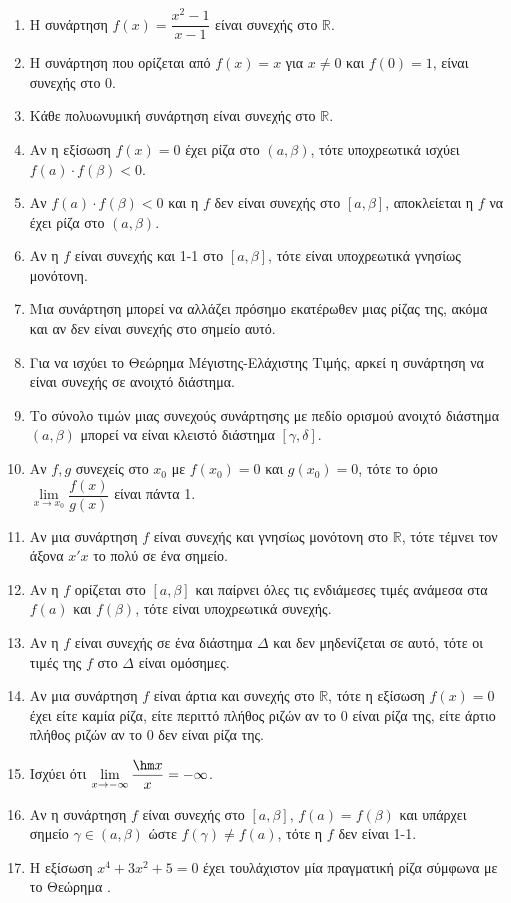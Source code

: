 \begin{enumerate}[label=\textbf{1.\arabic*.}]
    \item Η συνάρτηση $f(x) = \dfrac{x^2-1}{x-1}$ είναι συνεχής στο $\mathbb{R}$.
    \item Η συνάρτηση που ορίζεται από $f(x) = x$ για $x \neq 0$ και $f(0) = 1$, είναι συνεχής στο 0.
    \item Κάθε πολυωνυμική συνάρτηση είναι συνεχής στο $\mathbb{R}$.
    \item Αν η εξίσωση $f(x)=0$ έχει ρίζα στο $(a, \beta)$, τότε υποχρεωτικά ισχύει $f(a) \cdot f(\beta) < 0$.
    \item Αν $f(a) \cdot f(\beta) < 0$ και η $f$ δεν είναι συνεχής στο $[a, \beta]$, αποκλείεται η $f$ να έχει ρίζα στο $(a, \beta)$.
    \item Αν η $f$ είναι συνεχής και 1-1 στο $[a, \beta]$, τότε είναι υποχρεωτικά γνησίως μονότονη.
    \item Μια συνάρτηση μπορεί να αλλάζει πρόσημο εκατέρωθεν μιας ρίζας της, ακόμα και αν δεν είναι συνεχής στο σημείο αυτό.
    \item Για να ισχύει το Θεώρημα Μέγιστης-Ελάχιστης Τιμής, αρκεί η συνάρτηση να είναι συνεχής σε ανοιχτό διάστημα.
    \item Το σύνολο τιμών μιας συνεχούς συνάρτησης με πεδίο ορισμού ανοιχτό διάστημα $(a, \beta)$ μπορεί να είναι κλειστό διάστημα $[\gamma, \delta]$.
    \item Αν $f, g$ συνεχείς στο $x_0$ με $f(x_0)=0$ και $g(x_0)=0$, τότε το όριο $\lim\limits_{x \to x_0} \dfrac{f(x)}{g(x)}$ είναι πάντα 1.
    \item Αν μια συνάρτηση $f$ είναι συνεχής και γνησίως μονότονη στο $\mathbb{R}$, τότε τέμνει τον άξονα $x'x$ το πολύ σε ένα σημείο.
    \item Αν η $f$ ορίζεται στο $[a,\beta]$ και παίρνει όλες τις ενδιάμεσες τιμές ανάμεσα στα $f(a)$ και $f(\beta)$, τότε είναι υποχρεωτικά συνεχής.
    \item Αν η $f$ είναι συνεχής σε ένα διάστημα $\Delta$ και δεν μηδενίζεται σε αυτό, τότε οι τιμές της $f$ στο $\Delta$ είναι ομόσημες.
    \item Αν μια συνάρτηση $f$ είναι άρτια και συνεχής στο $\mathbb{R}$, τότε η εξίσωση $f(x)=0$ έχει είτε καμία ρίζα, είτε περιττό πλήθος ριζών αν το $0$ είναι ρίζα της, είτε άρτιο πλήθος ριζών αν το $0$ δεν είναι ρίζα της.
    \item Ισχύει ότι $\lim\limits_{x \to -\infty} \dfrac{\hm x}{x} = -\infty$.
    \item Αν η συνάρτηση $f$ είναι συνεχής στο $[a,\beta]$, $f(a)=f(\beta)$ και υπάρχει σημείο $\gamma \in (a,\beta)$ ώστε $f(\gamma) \neq f(a)$, τότε η $f$ δεν είναι 1-1.
    \item Η εξίσωση $x^4 + 3x^2 + 5 = 0$ έχει τουλάχιστον μία πραγματική ρίζα σύμφωνα με το Θεώρημα .
\end{enumerate}

